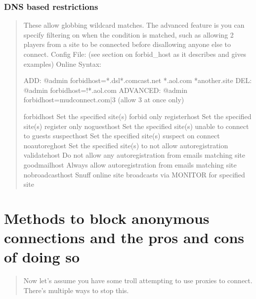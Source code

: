 \documentclass[letterpaper,10pt,english]{sphinxmanual}
\begin{document}
\subsubsection{DNS based restrictions}
\label{\detokenize{security:dns-based-restrictions}}\begin{quote}

\sphinxAtStartPar
These allow globbing wildcard matches.
The advanced feature is you can specify filtering on
when the condition is matched, such as allowing 2 players from a site to
be connected before disallowing anyone else to connect.
Config File: (see section on forbid\_host as it describes and gives examples)
Online Syntax:

\begin{sphinxVerbatim}[commandchars=\\\{\}]
        ADD:      @admin forbid\PYGZus{}host=*.dsl*.comcast.net *.aol.com *another.site
        DEL:      @admin forbid\PYGZus{}host=!*.aol.com
        ADVANCED: @admin forbid\PYGZus{}host=mudconnect.com|3 (allow 3 at once only)

forbid\PYGZus{}host     \PYGZhy{} Set the specified site(s) forbid only
register\PYGZus{}host   \PYGZhy{} Set the specified site(s) register only
noguest\PYGZus{}host    \PYGZhy{} Set the specified site(s) unable to connect to guests
suspect\PYGZus{}host    \PYGZhy{} Set the specified site(s) suspect on connect
noautoreg\PYGZus{}host  \PYGZhy{} Set the specified site(s) to not allow autoregistration
validate\PYGZus{}host   \PYGZhy{} Do not allow any autoregistration from emails matching site
goodmail\PYGZus{}host   \PYGZhy{} Always allow autoregistration from emails matching site
nobroadcast\PYGZus{}host \PYGZhy{} Snuff online site broadcasts via MONITOR for specified site
\end{sphinxVerbatim}
\end{quote}


\section{Methods to block anonymous connections and the pros and cons of doing so}
\label{\detokenize{security:methods-to-block-anonymous-connections-and-the-pros-and-cons-of-doing-so}}\begin{quote}

\sphinxAtStartPar
Now let’s assume you have some troll attempting to use proxies to connect.
There’s multiple ways to stop this.
\end{quote}
\end{document}

